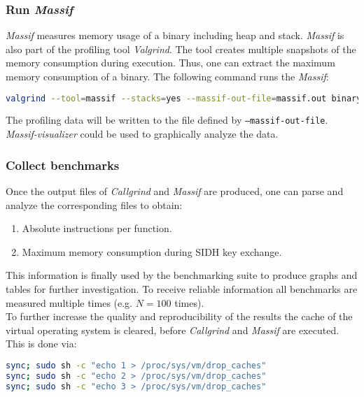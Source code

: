 \subsubsection{Run \textit{Massif}}
\textit{Massif} measures memory usage of a binary including heap and stack. \textit{Massif} is also part of the profiling tool \textit{Valgrind}. The tool creates multiple snapshots of the memory consumption during execution. Thus, one can extract the maximum memory consumption of a binary. The following command runs the \textit{Massif}:
\begin{lstlisting}[language=Bash]
valgrind --tool=massif --stacks=yes --massif-out-file=massif.out binary
\end{lstlisting}
The profiling data will be written to the file defined by \texttt{--massif-out-file}. \textit{Massif-visualizer} could be used to graphically analyze the data.

\subsubsection{Collect benchmarks}
Once the output files of \textit{Callgrind} and \textit{Massif} are produced, one can parse and analyze the corresponding files to obtain:
\begin{enumerate}
\item Absolute instructions per function.
\item Maximum memory consumption during SIDH key exchange.
\end{enumerate}
This information is finally used by the benchmarking suite to produce graphs and tables for further investigation. To receive reliable information all benchmarks are measured multiple times (e.g. $N=100$ times).\\
To further increase the quality and reproducibility of the results the cache of the virtual operating system is cleared, before \textit{Callgrind} and \textit{Massif} are executed. This is done via:
\begin{lstlisting}[language=Bash]
sync; sudo sh -c "echo 1 > /proc/sys/vm/drop_caches"
sync; sudo sh -c "echo 2 > /proc/sys/vm/drop_caches"
sync; sudo sh -c "echo 3 > /proc/sys/vm/drop_caches"
\end{lstlisting}


